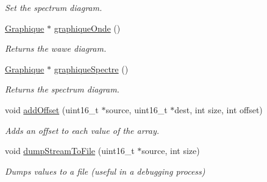 \begin{DoxyCompactItemize}
\begin{DoxyCompactList}\small\item\em Set the spectrum diagram. \item\end{DoxyCompactList}\item 
\hypertarget{classStreamPlayer_acae8624a9ed52641807001eeeb276131}{
\hyperlink{classGraphique}{Graphique} $\ast$ \hyperlink{classStreamPlayer_acae8624a9ed52641807001eeeb276131}{graphiqueOnde} ()}
\label{classStreamPlayer_acae8624a9ed52641807001eeeb276131}

\begin{DoxyCompactList}\small\item\em Returns the wawe diagram. \item\end{DoxyCompactList}\item 
\hypertarget{classStreamPlayer_a3452e0ce427432a46c3bc159c7c3bdfd}{
\hyperlink{classGraphique}{Graphique} $\ast$ \hyperlink{classStreamPlayer_a3452e0ce427432a46c3bc159c7c3bdfd}{graphiqueSpectre} ()}
\label{classStreamPlayer_a3452e0ce427432a46c3bc159c7c3bdfd}

\begin{DoxyCompactList}\small\item\em Returns the spectrum diagram. \item\end{DoxyCompactList}\item 
\hypertarget{classStreamPlayer_adf7d2c0f035da6f66e1752df7be19f0b}{
void \hyperlink{classStreamPlayer_adf7d2c0f035da6f66e1752df7be19f0b}{addOffset} (uint16\_\-t $\ast$source, uint16\_\-t $\ast$dest, int size, int offset)}
\label{classStreamPlayer_adf7d2c0f035da6f66e1752df7be19f0b}

\begin{DoxyCompactList}\small\item\em Adds an offset to each value of the array. \item\end{DoxyCompactList}\item 
\hypertarget{classStreamPlayer_af8184e320bf99c57e647549da8c4a250}{
void \hyperlink{classStreamPlayer_af8184e320bf99c57e647549da8c4a250}{dumpStreamToFile} (uint16\_\-t $\ast$source, int size)}
\label{classStreamPlayer_af8184e320bf99c57e647549da8c4a250}

\begin{DoxyCompactList}\small\item\em Dumps values to a file (useful in a debugging process) \item\end{DoxyCompactList}\end{DoxyCompactItemize}
